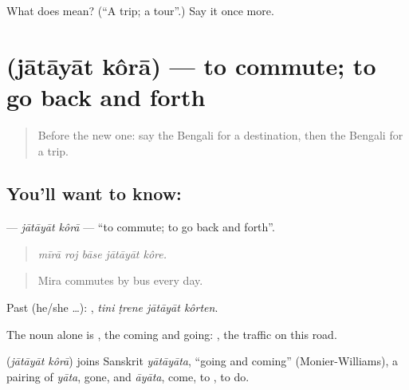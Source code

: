 \begin{tcolorbox}[breakable,colback=teal!4,colframe=teal!35!black,title={Before you move on}]
What does  mean? (\textquotedblleft{}A trip; a tour\textquotedblright{}.) Say it once more.
\end{tcolorbox}
\section[\texorpdfstring{\bn{যাতায়াত} \bn{করা} (jātāyāt kôrā)}{যাতায়াত করা (jātāyāt kôrā)}]{  (jātāyāt kôrā) — to commute; to go back and forth}

\label{lesson:BN-C387-jatayat-kora}



\begin{quote}
Before the new one: say the Bengali for a destination, then the Bengali for a trip.
\end{quote}

\subsection*{You'll want to know:  }
\textbf{ } — \emph{jātāyāt kôrā} — \textquotedblleft{}to commute; to go back and forth\textquotedblright{}.

\begin{quote}
    
\end{quote}

\begin{quote}
\emph{mīrā roj bāse jātāyāt kôre.}
\end{quote}

\begin{quote}
Mira commutes by bus every day.
\end{quote}

Past (he/she …):    , \emph{tini ṭrene jātāyāt kôrten}.

The noun alone is , the coming and going:   , the traffic on this road.

\begin{cousinweb}
\textbf{ } (\emph{jātāyāt kôrā}) joins Sanskrit \emph{yātāyāta}, \textquotedblleft{}going and coming\textquotedblright{} (Monier-Williams), a pairing of \emph{yāta}, gone, and \emph{āyāta}, come, to , to do.
\end{cousinweb}


